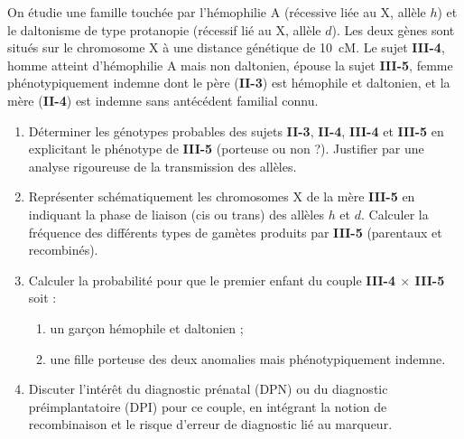 \documentclass[11pt]{article}
\begin{document}
\begin{exercice}
On étudie une famille touchée par l'hémophilie A (récessive liée au X, allèle $h$) et le daltonisme de type protanopie (récessif lié au X, allèle $d$). Les deux gènes sont situés sur le chromosome X à une distance génétique de \SI{10}{cM}. Le sujet \textbf{III-4}, homme atteint d'hémophilie A mais non daltonien, épouse la sujet \textbf{III-5}, femme phénotypiquement indemne dont le père (\textbf{II-3}) est hémophile et daltonien, et la mère (\textbf{II-4}) est indemne sans antécédent familial connu.
\begin{enumerate}
    \item Déterminer les génotypes probables des sujets \textbf{II-3}, \textbf{II-4}, \textbf{III-4} et \textbf{III-5} en explicitant le phénotype de \textbf{III-5} (porteuse ou non ?). Justifier par une analyse rigoureuse de la transmission des allèles.
    \item Représenter schématiquement les chromosomes X de la mère \textbf{III-5} en indiquant la phase de liaison (cis ou trans) des allèles $h$ et $d$. Calculer la fréquence des différents types de gamètes produits par \textbf{III-5} (parentaux et recombinés).
    \item Calculer la probabilité pour que le premier enfant du couple \textbf{III-4 $\times$ III-5} soit :
    \begin{enumerate}
        \item un garçon hémophile et daltonien ;
        \item une fille porteuse des deux anomalies mais phénotypiquement indemne.
    \end{enumerate}
    \item Discuter l'intérêt du diagnostic prénatal (DPN) ou du diagnostic préimplantatoire (DPI) pour ce couple, en intégrant la notion de recombinaison et le risque d'erreur de diagnostic lié au marqueur.
\end{enumerate}
\end{exercice}
\end{document}
